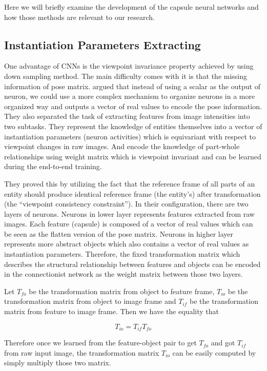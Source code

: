 \documentclass{article} \usepackage{tabularx}
\renewcommand{\citename}{\citet} \renewcommand{\cite}{\citep}
\begin{document}
Here we will briefly examine the development of the capsule
neural networks and how those methods are relevant to our
research.

\subsection{Instantiation Parameters Extracting}
\label{sec:instan}

One advantage of CNNs is the viewpoint invariance property
achieved by using down sampling method. The main difficulty comes
with it is that the missing information of pose matrix.
\citename{zemel1990traffic} argued that instead of using a scalar
as the output of neuron, we could use a more complex mechanism to
organize neurons in a more organized way and outputs a vector of
real values to encode the pose information. They also separated
the task of extracting features from image intensities into two
subtasks. They represent the knowledge of entities themselves
into a vector of instantiation parameters (neuron activities)
which is equivariant with respect to viewpoint changes in raw
images. And encode the knowledge of part-whole relationships
using weight matrix which is viewpoint invariant and can be
learned during the end-to-end training.

They proved this by utilizing the fact that the reference frame
of all parts of an entity should produce identical reference
frame (the entity's) after transformation (the ``viewpoint
consistency constraint''). In their configuration, there are two
layers of neurons. Neurons in lower layer represents features
extracted from raw images. Each feature (capsule) is composed of
a vector of real values which can be seen as the flatten version
of the pose matrix. Neurons in higher layer represents more
abstract objects which also contains a vector of real values as
instantiation parameters. Therefore, the fixed transformation
matrix which describes the structural relationship between
features and objects can be encoded in the connectionist network
as the weight matrix between those two layers.

Let $T_{fo}$ be the transformation matrix from object to feature
frame, $T_{io}$ be the transformation matrix from object to
image frame and $T_{if}$ be the transformation matrix from
feature to image frame. Then we have the equality that

$$T_{io}=T_{if}T_{fo}$$

Therefore once we learned from the feature-object pair to get
$T_{fo}$ and got $T_{if}$ from raw input image, the
transformation matrix $T_{io}$ can be easily computed by simply
multiply those two matrix.
\end{document}
